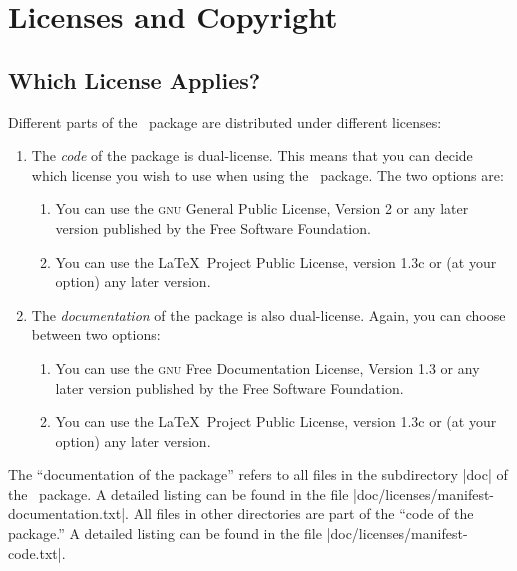 %
%
%

\section{Licenses and Copyright}
\label{section-license}

\subsection{Which License Applies?}

Different parts of the \beamer\ package are distributed under different licenses:
\begin{enumerate}
\item
  The \emph{code} of the package is dual-license. This means that you can decide which license you wish to use when using the \beamer\ package. The two options are:
  \begin{enumerate}
  \item
    You can use the \textsc{gnu} General Public License, Version 2 or any later version published by the Free Software Foundation.
  \item
    You can use the \LaTeX\ Project Public License, version 1.3c or (at your option) any later version.
  \end{enumerate}
\item
  The \emph{documentation} of the package is also dual-license. Again, you can choose between two options:
  \begin{enumerate}
  \item
    You can use the \textsc{gnu} Free Documentation License, Version 1.3 or any later version published by the Free Software Foundation.
  \item
    You can use the \LaTeX\ Project Public License, version 1.3c or (at your option) any later version.
  \end{enumerate}
\end{enumerate}

The ``documentation of the package'' refers to all files in the subdirectory |doc| of the \beamer\ package. A detailed listing can be found in the file |doc/licenses/manifest-documentation.txt|. All files in other directories are part of the ``code of the package.'' A detailed listing can be found in the file |doc/licenses/manifest-code.txt|.

